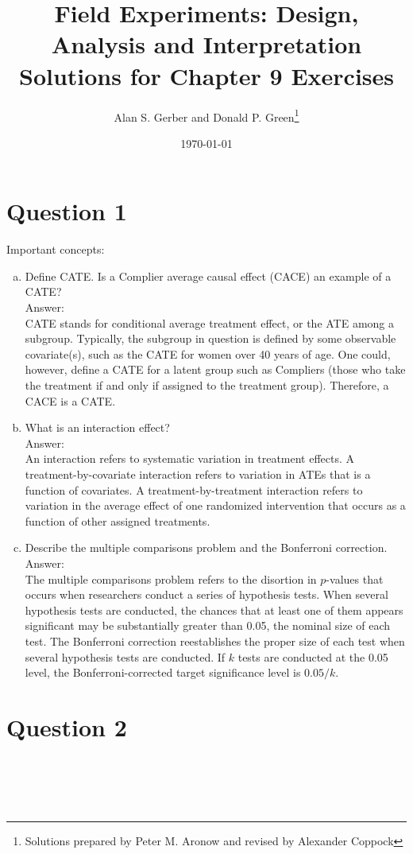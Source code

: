 \documentclass[11pt,notitlepage]{article}\usepackage[]{graphicx}\usepackage[]{color}
\title{Field Experiments: Design, Analysis and Interpretation \\
Solutions for Chapter 9 Exercises}
\author{Alan S. Gerber and Donald P. Green\footnote{Solutions prepared by Peter M. Aronow and revised by Alexander Coppock}}
\date{\today}
\makeatletter
\newenvironment{kframe}{%
 \def\at@end@of@kframe{}%
 \ifinner\ifhmode%
  \def\at@end@of@kframe{\end{minipage}}%
  \begin{minipage}{\columnwidth}%
 \fi\fi%
 \def\FrameCommand##1{\hskip\@totalleftmargin \hskip-\fboxsep
 \colorbox{shadecolor}{##1}\hskip-\fboxsep
     \hskip-\linewidth \hskip-\@totalleftmargin \hskip\columnwidth}%
 \MakeFramed {\advance\hsize-\width
   \@totalleftmargin\z@ \linewidth\hsize
   \@setminipage}}%
 {\par\unskip\endMakeFramed%
 \at@end@of@kframe}
\newenvironment{knitrout}{}{} %
\makeatother
\begin{document}
\maketitle


\section*{Question 1}
Important concepts:

\begin{enumerate}[a)]
\item Define CATE. Is a Complier average causal effect (CACE) an example of a CATE?\\
Answer:\\
CATE stands for conditional average treatment effect, or the ATE among a subgroup. Typically, the subgroup in question is defined by some observable covariate(s), such as the CATE for women over 40 years of age. One could, however, define a CATE for a latent group such as Compliers (those who take the treatment if and only if assigned to the treatment group). Therefore, a CACE is a CATE.

\item What is an interaction effect?\\
Answer:\\
An interaction refers to systematic variation in treatment effects. A treatment-by-covariate interaction refers to variation in ATEs that is a function of covariates. A treatment-by-treatment interaction refers to variation in the average effect of one randomized intervention that occurs as a function of other assigned treatments.

\item Describe the multiple comparisons problem and the Bonferroni correction.\\
Answer:\\
The multiple comparisons problem refers to the disortion in $p$-values that occurs when researchers conduct a series of hypothesis tests. When several hypothesis tests are conducted, the chances that at least one of them appears significant may be substantially greater than 0.05, the nominal size of each test. The Bonferroni correction reestablishes the proper size of each test when several hypothesis tests are conducted.   If $k$ tests are conducted at the 0.05 level, the Bonferroni-corrected target significance level is $0.05/k$.
\end{enumerate}

\section*{Question 2}
\begin{knitrout}
\color{fgcolor}\begin{kframe}
\begin{verbatim}





\end{verbatim}
\end{kframe}
\end{knitrout}
\end{document}
